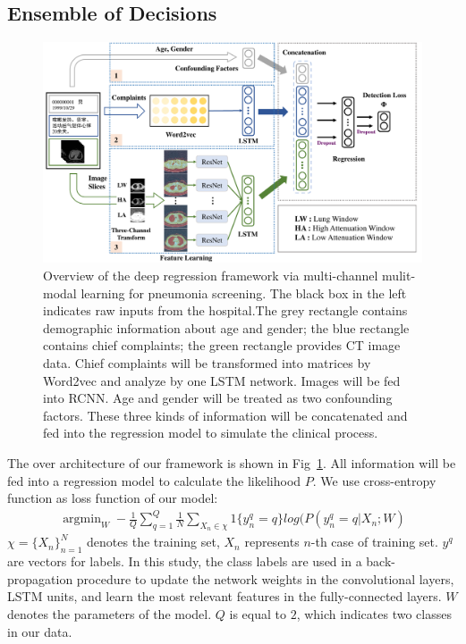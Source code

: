 \documentclass[journal]{IEEEtran}
\begin{document}
\subsection{Ensemble of Decisions}
\begin{figure}[htbp]
    \centerline{\includegraphics[width=160mm]{MPD2.pdf}}
    \vspace{-0cm}
    \caption{Overview of the deep regression framework via multi-channel mulit-modal learning for pneumonia screening. 
    The black box in the left indicates raw inputs from the hospital.The grey rectangle contains demographic information about age and gender; the blue rectangle contains chief complaints; the green rectangle provides CT image data. Chief complaints will be transformed into matrices by Word2vec and analyze by one LSTM network. Images will be fed into RCNN. Age and gender will be treated as two confounding factors. These three kinds of information will be concatenated and fed into the regression model to simulate the clinical process.}
    \vspace{-0cm}
    \label{architecture}

    \end{figure}
The over architecture of our framework is shown in Fig~\ref{architecture}.
All information will be fed into a regression model to calculate the likelihood $P$.
We use cross-entropy function as loss function of our model:
\begin{align*}\label{classifyandloss1}
    \mathop{\arg\min}_{W} -\frac{1}{Q} \sum_{q=1}^{Q} \frac{1}{N} \sum_{X_n\in\chi} 1 \{ y_n^q = q\} log(P(y_n^q=q|X_n;W)
\end{align*}
$\chi=\{X_n\}_{n=1}^N$ denotes the training set, $X_n$ represents $n$-th case of training set. $y^q$ are vectors for labels. In this study, the class labels are used in a back-propagation procedure to update the network weights in the convolutional layers, LSTM units, and learn the most relevant features in the fully-connected layers. $W$ denotes the parameters of the model. $Q$ is equal to $2$, which indicates two classes in our data.
\end{document}
